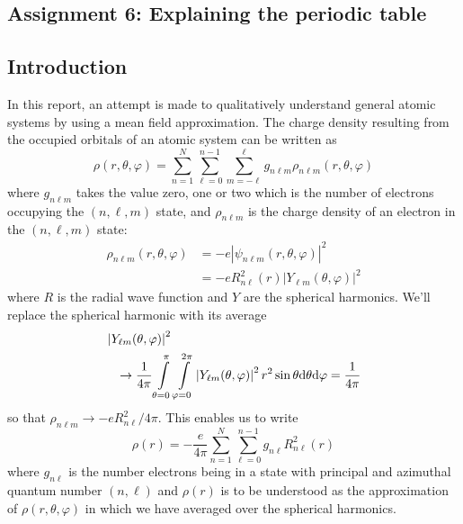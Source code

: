 \documentclass[twocolumn]{article}
\begin{document}
\begin{large}
\section*{Assignment 6: Explaining the periodic table}
\subsection*{Introduction}
In this report, an attempt is made to qualitatively understand general atomic systems by using a mean field approximation. The charge density resulting from the occupied orbitals of an atomic system can be written as 
\begin{equation}
    \rho(r,\theta,\varphi) = \sum_{n=1}^{N}\sum_{\ell=0}^{n-1}\sum_{m=-\ell}^{\ell}g_{n\ell m}\rho_{n\ell m}(r,\theta,\varphi)
\end{equation}
where $g_{n\ell m}$ takes the value zero, one or two which is the number of electrons occupying the $(n,\ell,m)$ state, and $\rho_{n\ell m}$ is the charge density of an electron in the $(n,\ell,m)$ state:
\begin{equation}
    \begin{split}
        \rho_{n\ell m}(r,\theta,\varphi) &= -e\left|\psi_{n\ell m}(r,\theta,\varphi)\right|^2 \\ 
        &= -eR^2_{n\ell}(r)\left|Y_{\ell m}(\theta,\varphi)\right|^2
    \end{split}
\end{equation}
where $R$ is the radial wave function and $Y$ are the spherical harmonics. We'll replace the spherical harmonic with its average
\begin{equation}
    \begin{split}
        &\left|Y_{\ell m}(\theta,\varphi)\right|^2 \\ 
        &\hspace{0.3cm}\to \frac{1}{4\pi}\int\limits_{\theta=0}^\pi\int\limits_{\varphi=0}^{2\pi}\left|Y_{\ell m}(\theta,\varphi)\right|^2r^2\sin\theta\text{d}\theta\text{d}\varphi = \frac{1}{4\pi}
    \end{split}
\end{equation}
so that $\rho_{n\ell m} \to -eR^2_{n\ell}/4\pi$. This enables us to write 
\begin{equation}
    \label{30apr1108}
    \rho(r) = -\frac{e}{4\pi}\sum_{n=1}^{N}\sum_{\ell=0}^{n-1}g_{n\ell}R^2_{n\ell}(r)
\end{equation}
where $g_{n\ell}$ is the number electrons being in a state with principal and azimuthal quantum number $(n,\ell)$ and $\rho(r)$ is to be understood as the approximation of $\rho(r,\theta,\varphi)$ in which we have averaged over the spherical harmonics.


\end{large}
\end{document}
